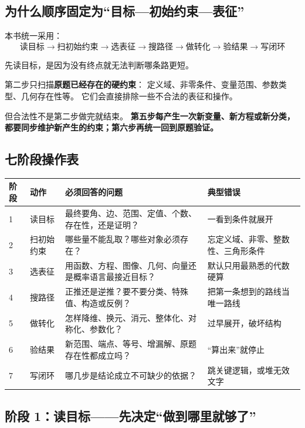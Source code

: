 \documentclass[11pt,a4paper]{ctexart}
\begin{document}
\subsection{为什么顺序固定为“目标—初始约束—表征”}

本书统一采用：
\[
\boxed{
\text{读目标}
\rightarrow
\text{扫初始约束}
\rightarrow
\text{选表征}
\rightarrow
\text{搜路径}
\rightarrow
\text{做转化}
\rightarrow
\text{验结果}
\rightarrow
\text{写闭环}}
\]

先读目标，是因为没有终点就无法判断哪条路更短。

第二步只扫描\textbf{原题已经存在的硬约束}：
定义域、非零条件、变量范围、参数类型、几何存在性等。
它们会直接排除一些不合法的表征和操作。

但合法性不是第二步做完就结束。
\textbf{第五步每产生一次新变量、新方程或新分类，都要同步维护新产生的约束；第六步再统一回到原题验证。}

\subsection{七阶段操作表}

\begin{longtable}{p{1.25cm}p{2.4cm}p{6.0cm}p{5.2cm}}
\toprule
\textbf{阶段} & \textbf{动作} & \textbf{必须回答的问题} & \textbf{典型错误}\\
\midrule
1 & 读目标 & 最终要角、边、范围、定值、个数、存在性，还是证明？ & 一看到条件就展开\\ \hline
2 & 扫初始约束 & 哪些量不能乱取？哪些对象必须存在？ & 忘定义域、非零、整数性、三角形条件\\ \hline
3 & 选表征 & 用函数、方程、图像、几何、向量还是概率语言最接近目标？ & 默认只用最熟悉的代数硬算\\ \hline
4 & 搜路径 & 正推还是逆推？要不要分类、特殊值、构造或反例？ & 把第一条想到的路线当唯一路线\\ \hline
5 & 做转化 & 怎样降维、换元、消元、整体化、对称化、参数化？ & 过早展开，破坏结构\\ \hline
6 & 验结果 & 新范围、端点、等号、增漏解、原题存在性都成立吗？ & “算出来”就停止\\ \hline
7 & 写闭环 & 哪几步是结论成立不可缺少的依据？ & 跳关键逻辑，或堆无效文字\\
\bottomrule
\end{longtable}

\subsection{阶段 1：读目标——先决定“做到哪里就够了”}
\end{document}
